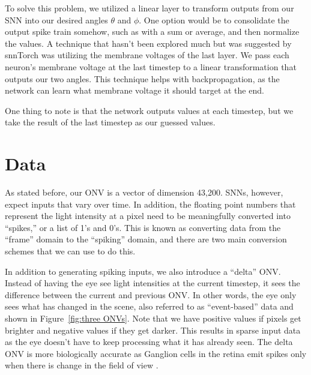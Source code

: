 \documentclass [MS] {UCLAthesis}
\begin{document}

To solve this problem, we utilized a linear layer to transform outputs from our SNN into our desired angles $\theta$ and $\phi$. One option would be to consolidate the output spike train somehow, such as with a sum or average, and then normalize the values. A technique that hasn't been explored much but was suggested by snnTorch was utilizing the membrane voltages of the last layer. We pass each neuron's membrane voltage at the last timestep to a linear transformation that outputs our two angles. This technique helps with backpropagation, as the network can learn what membrane voltage it should target at the end.

One thing to note is that the network outputs values at each timestep, but we take the result of the last timestep as our guessed values.


\chapter{Data}

As stated before, our ONV is a vector of dimension 43,200. SNNs, however, expect inputs that vary over time. In addition, the floating point numbers that represent the light intensity at a pixel need to be meaningfully converted into ``spikes,'' or a list of 1's and 0's. This is known as converting data from the ``frame'' domain to the ``spiking'' domain, and there are two main conversion schemes that we can use to do this.

In addition to generating spiking inputs, we also introduce a ``delta'' ONV. Instead of having the eye see light intensities at the current timestep, it sees the difference between the current and previous ONV. In other words, the eye only sees what has changed in the scene, also referred to as ``event-based'' data and shown in Figure~\ref{fig:three ONVs}. Note that we have positive values if pixels get brighter and negative values if they get darker. This results in sparse input data as the eye doesn't have to keep processing what it has already seen. The delta ONV is more biologically accurate as Ganglion cells in the retina emit spikes only when there is change in the field of view \citep{eventRetina}.
\end{document}
